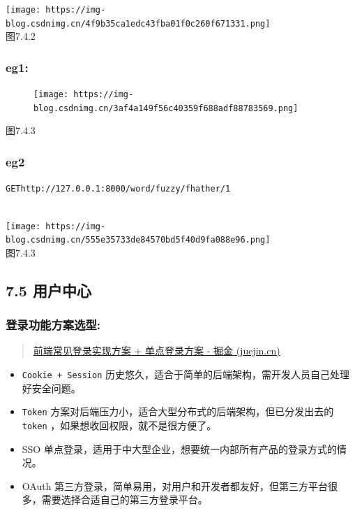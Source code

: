 \documentclass[
]{article}
\begin{document}
\texttt{[image: https://img-blog.csdnimg.cn/4f9b35ca1edc43fba01f0c260f671331.png]}\\
图7.4.2

\hypertarget{eg1}{%
\subsubsection{eg1:}\label{eg1}}

\begin{figure}
\centering
\texttt{[image: https://img-blog.csdnimg.cn/3af4a149f56c40359f688adf88783569.png]}
\caption{}
\end{figure}

图7.4.3

\hypertarget{eg2}{%
\subsubsection{eg2}\label{eg2}}

\texttt{GEThttp://127.0.0.1:8000/word/fuzzy/fhather/1}\strut \\
\texttt{[image: https://img-blog.csdnimg.cn/555e35733de84570bd5f40d9fa088e96.png]}\\
图7.4.3

\hypertarget{75-ux7528ux6237ux4e2dux5fc3}{%
\subsection{7.5 用户中心}\label{75-ux7528ux6237ux4e2dux5fc3}}

\hypertarget{ux767bux5f55ux529fux80fdux65b9ux6848ux9009ux578b}{%
\subsubsection{登录功能方案选型:}\label{ux767bux5f55ux529fux80fdux65b9ux6848ux9009ux578b}}

\begin{quote}
\href{https://juejin.cn/post/6933115003327217671}{前端常见登录实现方案 +
单点登录方案 - 掘金 (juejin.cn)}
\end{quote}

\begin{itemize}
\item
  \texttt{Cookie\ +\ Session}
  历史悠久，适合于简单的后端架构，需开发人员自己处理好安全问题。
\item
  \texttt{Token}
  方案对后端压力小，适合大型分布式的后端架构，但已分发出去的
  \texttt{token} ，如果想收回权限，就不是很方便了。
\item
  SSO 单点登录，适用于中大型企业，想要统一内部所有产品的登录方式的情况。
\item
  OAuth
  第三方登录，简单易用，对用户和开发者都友好，但第三方平台很多，需要选择合适自己的第三方登录平台。
\end{itemize}
\end{document}
